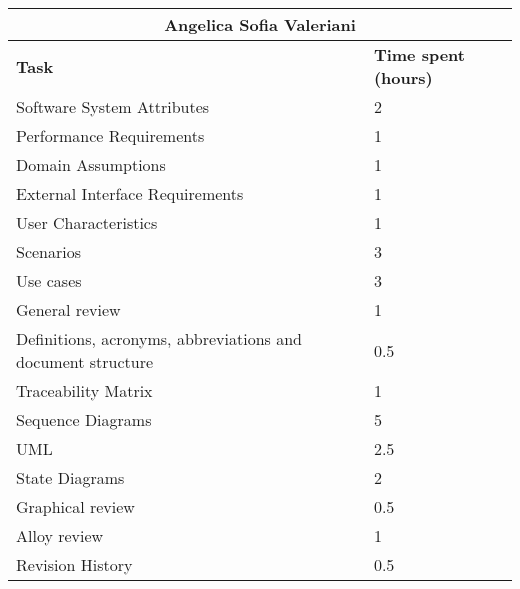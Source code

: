 \begin{table}[ht]
  \center
  \begin{tabular}{l|l}
    \multicolumn{2}{c}{\textbf{Angelica Sofia Valeriani}} \\
    \hline
    \textbf{Task} & \textbf{Time spent (hours)}\\
    \hline
    Software System Attributes & 2 \\
    Performance Requirements & 1 \\
    Domain Assumptions & 1 \\
    External Interface Requirements & 1 \\
    User Characteristics & 1 \\
    Scenarios & 3 \\
    Use cases & 3 \\
    General review & 1 \\
    Definitions, acronyms, abbreviations and document structure & 0.5 \\
    Traceability Matrix & 1 \\
    Sequence Diagrams & 5 \\
    UML & 2.5 \\
    State Diagrams & 2 \\
    Graphical review & 0.5 \\
    Alloy review & 1 \\
    Revision History & 0.5 \\
  \end{tabular}
\end{table}